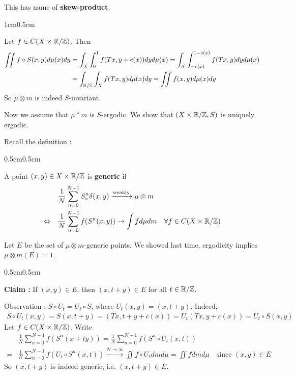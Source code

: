\documentclass[10pt,a4paper]{report}
\newenvironment{proof}
{\begin{changemargin}{1cm}{0.5cm} 
	}%
	{\end{changemargin}
}
\newenvironment{subproof}
{\begin{changemargin}{0.5cm}{0.5cm}
	}%
	{\end{changemargin}
}
\begin{document}
This has name of \textbf{skew-product}.
\begin{proof}
\pf Let $f \in C(X \times \mathbb{R}/\mathbb{Z})$. Then
\begin{align*}
\iint f\circ S(x,y) d\mu(x)dy  &= \int_X \int_0^1 f(Tx,y+c(x)) dyd\mu(x) = \int_X \int_{-c(x)}^{1-c(x)} f(Tx,y)dyd\mu (x) \\
&= \int_{\mathbb{R}/\mathbb{Z}}\int_X f(Tx,y)d\mu(x)dy = \iint f(x,y)d\mu(x)dy
\end{align*}
So $\mu \otimes m$ is indeed $S$-invariant.
\s

Now we assume that $\mu *m$ is $S$-ergodic. We show that $(X\times \mathbb{R}/\mathbb{Z},S)$ is uniquely ergodic.
\s

Recall the definition :

\begin{subproof}
 A point $(x,y) \in X\times \mathbb{R}/\mathbb{Z}$ is \textbf{generic} if
\begin{align*}
& \frac{1}{N} \sum_{n=0}^{N-1} S^n_* \delta(x,y) \xrightarrow{\text{weakly}} \mu \otimes m \\
\Leftrightarrow \quad & \frac{1}{N}\sum_{n=0}^{N-1} f(S^n(x,y)) \rightarrow \int fd\mu dm \quad \forall f\in C(X\times \mathbb{R}/\mathbb{Z})
\end{align*}
\end{subproof}
\s

Let $E$ be the set of $\mu \otimes m$-generic points. We showed last time, ergodicity implies $\mu \otimes m(E) =1$.
\s

\begin{subproof}
\textbf{Claim : } If $(x,y) \in E$, then $(x,t+y) \in E$ for all $t\in \mathbb{R}/\mathbb{Z}$.

\pf Observation : $S\circ U_t = U_t \circ S$, where $U_t(x,y)=(x,t+y)$. Indeed,
\begin{align*}
S\circ U_t(x,y) = S(x,t+y) = (Tx,t+y+c(x)) =U_t(Tx,y+c(x)) =  U_t \circ S(x,y)
\end{align*}
Let $f\in C(X\times \mathbb{R}/\mathbb{Z})$. Write
\begin{align*}
&\frac{1}{N} \sum_{n=0}^{N-1} f(S^n(x+ty)) = \frac{1}{N}\sum_{n=0}^{N-1} f(S^n \circ U_t(x,t)) \\
= & \frac{1}{N}\sum_{n=0}^{N-1} f(U_t \circ S^n(x,t)) \xrightarrow{N\rightarrow \infty} \iint f\circ U_t dm d\mu = \iint f dmd\mu \quad \text{since } (x,y) \in E
\end{align*}
So $(x,t+y)$ is indeed generic, i.e. $(x,t+y) \in E$.
\end{subproof}
\s


\end{proof}
\end{document}
